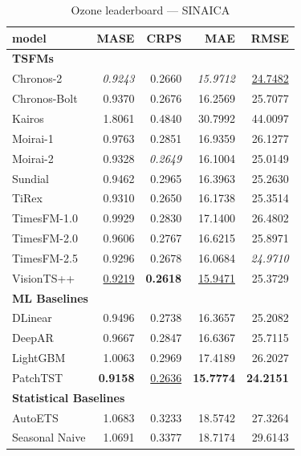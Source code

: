 \begin{table}[H]
\caption{Ozone leaderboard --- SINAICA}
\centering
\begin{small}
\begin{tabular}{lrrrr}
\toprule
model & MASE & CRPS & MAE & RMSE \\
\midrule
\multicolumn{5}{l}{\textbf{TSFMs}} \\
Chronos-2 & \textit{0.9243} & 0.2660 & \textit{15.9712} & \underline{24.7482} \\
Chronos-Bolt & 0.9370 & 0.2676 & 16.2569 & 25.7077 \\
Kairos & 1.8061 & 0.4840 & 30.7992 & 44.0097 \\
Moirai-1 & 0.9763 & 0.2851 & 16.9359 & 26.1277 \\
Moirai-2 & 0.9328 & \textit{0.2649} & 16.1004 & 25.0149 \\
Sundial & 0.9462 & 0.2965 & 16.3963 & 25.2630 \\
TiRex & 0.9310 & 0.2650 & 16.1738 & 25.3514 \\
TimesFM-1.0 & 0.9929 & 0.2830 & 17.1400 & 26.4802 \\
TimesFM-2.0 & 0.9606 & 0.2767 & 16.6215 & 25.8971 \\
TimesFM-2.5 & 0.9296 & 0.2678 & 16.0684 & \textit{24.9710} \\
VisionTS++ & \underline{0.9219} & \textbf{0.2618} & \underline{15.9471} & 25.3729 \\
\midrule
\multicolumn{5}{l}{\textbf{ML Baselines}} \\
DLinear & 0.9496 & 0.2738 & 16.3657 & 25.2082 \\
DeepAR & 0.9667 & 0.2847 & 16.6367 & 25.7115 \\
LightGBM & 1.0063 & 0.2969 & 17.4189 & 26.2027 \\
PatchTST & \textbf{0.9158} & \underline{0.2636} & \textbf{15.7774} & \textbf{24.2151} \\
\midrule
\multicolumn{5}{l}{\textbf{Statistical Baselines}} \\
AutoETS & 1.0683 & 0.3233 & 18.5742 & 27.3264 \\
Seasonal Naive & 1.0691 & 0.3377 & 18.7174 & 29.6143 \\
\bottomrule
\end{tabular}
\end{small}
\end{table}